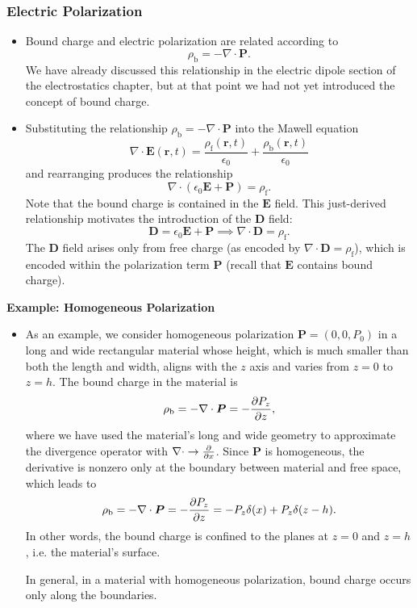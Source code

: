 \documentclass[11pt, a4paper]{article}
\renewcommand{\vec}[1]{\bm{#1}} %
\renewcommand{\r}{\vec{r}}
\newcommand{\E}{\vec{E}} %
\newcommand{\D}{\vec{D}}  %
\renewcommand{\P}{\vec{P}}  %
\newcommand{\ee}{\epsilon_{0}}  %
\renewcommand{\div}{\nabla \cdot}
\begin{document}
\subsubsection{Electric Polarization}
\begin{itemize}
	\item Bound charge and electric polarization are related according to
	\begin{equation*}
		\rho_{\text{b}} = - \div \P.
	\end{equation*}
    We have already discussed this relationship in the electric dipole section of the electrostatics chapter, but at that point we had not yet introduced the concept of bound charge.
	
	\item Substituting the relationship $ \rho_{\text{b}} = - \div \P $ into the Mawell equation
    \begin{equation*}
		\div \E (\r, t) = \frac{\rho_{\text{f}}(\r, t)}{\ee} + \frac{\rho_{\text{b}}(\r, t)}{\ee}
    \end{equation*}
    and rearranging produces the relationship
	\begin{equation*}
		\div (\ee \E + \P) = \rho_{\text{f}}.
	\end{equation*}
	Note that the bound charge is contained in the $ \E $ field. This just-derived relationship motivates the introduction of the $ \D $ field:
	\begin{equation*}
		\D = \ee \E + \P \implies \div \D = \rho_{\text{f}}.
	\end{equation*}
    The $ \D $ field arises only from free charge (as encoded by $ \div \D = \rho_{\text{f}} $), which is encoded within the polarization term $ \P $ (recall that $ \E $ contains bound charge).
\end{itemize}
	
\textbf{Example: Homogeneous Polarization}
\begin{itemize}
	\item As an example, we consider homogeneous polarization $ \P = (0, 0, P_{0}) $ in a long and wide rectangular material whose height, which is much smaller than both the length and width, aligns with the $ z $ axis and varies from $ z = 0 $ to $ z = h $. The bound charge in the material is
	\begin{equation*}
		\rho_{\text{b}} = - \div \P = - \pdv{P_{z}}{z},
	\end{equation*}
    where we have used the material's long and wide geometry to approximate the divergence operator with $ \div \to \pdv{x} $. Since $ \P $ is homogeneous, the derivative is nonzero only at the boundary between material and free space, which leads to
	\begin{equation*}
		\rho_{\text{b}} = - \div \P = - \pdv{P_{z}}{z} = - P_{z}\delta(x) + P_{z}\delta(z - h).
	\end{equation*}
	In other words, the bound charge is confined to the planes at $ z = 0 $ and $ z = h $, i.e. the material's surface. 

    In general, in a material with homogeneous polarization, bound charge occurs only along the boundaries.
\end{itemize}
\end{document}
